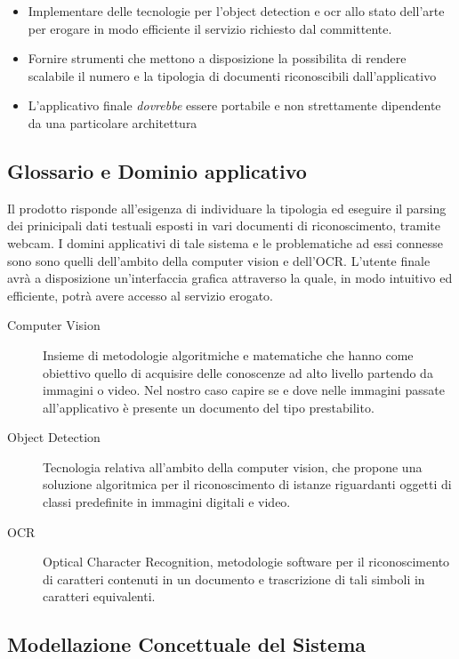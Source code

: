 \documentclass[12pt,a4paper]{article}
\begin{document}
\begin{itemize}
    \item Implementare delle tecnologie per l'object detection e ocr
        allo stato dell'arte per erogare in modo efficiente il servizio
        richiesto dal committente.
    \item Fornire strumenti che mettono a disposizione la possibilita di
        rendere scalabile il numero e la tipologia di documenti
        riconoscibili dall'applicativo
    \item L'applicativo finale \textit{dovrebbe} essere portabile e non
        strettamente dipendente da una particolare architettura
\end{itemize}

\subsection{Glossario e Dominio applicativo}

Il prodotto risponde all'esigenza di individuare la tipologia ed
eseguire il parsing dei prinicipali dati testuali esposti in vari
documenti di riconoscimento, tramite webcam.
I domini applicativi di tale sistema e le problematiche ad essi connesse
sono sono quelli dell'ambito della computer vision e dell'OCR.
L'utente finale avrà a disposizione un'interfaccia grafica attraverso la
quale, in modo intuitivo ed efficiente, potrà avere accesso al servizio
erogato.

\begin{description}
    \item[Computer Vision] Insieme di metodologie algoritmiche e
        matematiche che hanno come obiettivo quello di acquisire delle
        conoscenze ad alto livello partendo da immagini o video. Nel
        nostro caso capire se e dove nelle immagini passate
        all'applicativo è presente un documento del tipo prestabilito.
    \item[Object Detection] Tecnologia relativa all'ambito della
        computer vision, che propone una soluzione algoritmica per il
        riconoscimento di istanze riguardanti oggetti di classi
        predefinite in immagini digitali e video.
    \item[OCR] Optical Character Recognition, metodologie software per
        il riconoscimento di caratteri contenuti in un documento e
        trascrizione di tali simboli in caratteri equivalenti.
\end{description}

\subsection{Modellazione Concettuale del Sistema}
\end{document}
